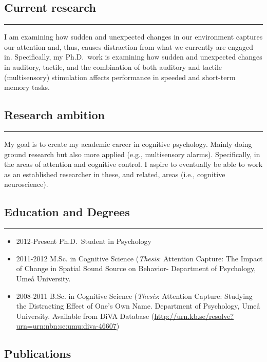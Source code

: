 \documentclass[]{article}
\begin{document}
\subsection{Current research}\label{current-research}

\hrule

I am examining how sudden and unexpected changes in our environment
captures our attention and, thus, causes distraction from what we
currently are engaged in. Specifically, my Ph.D.~work is examining how
sudden and unexpected changes in auditory, tactile, and the combination
of both auditory and tactile (multisensory) stimulation affects
performance in speeded and short-term memory tasks.

\subsection{Research ambition}\label{research-ambition}

\hrule

My goal is to create my academic career in cognitive psychology. Mainly
doing ground research but also more applied (e.g., multisensory alarms).
Specifically, in the areas of attention and cognitive control. I aspire
to eventually be able to work as an established researcher in these, and
related, areas (i.e., cognitive neuroscience).

\subsection{Education and Degrees}\label{education-and-degrees}

\hrule

\begin{itemize}
\item
  2012-Present Ph.D.~Student in Psychology
\item
  2011-2012 M.Sc. in Cognitive Science (\emph{Thesis}: Attention
  Capture: The Impact of Change in Spatial Sound Source on Behavior-
  Department of Psychology, Umeå University.
\item
  2008-2011 B.Sc. in Cognitive Science (\emph{Thesis}: Attention
  Capture: Studying the Distracting Effect of One's Own Name. Department
  of Psychology, Umeå University. Available from DiVA Database
  (\url{http://urn.kb.se/resolve?urn=urn:nbn:se:umu:diva-46607})
\end{itemize}

\subsection{Publications}\label{publications}
\end{document}
